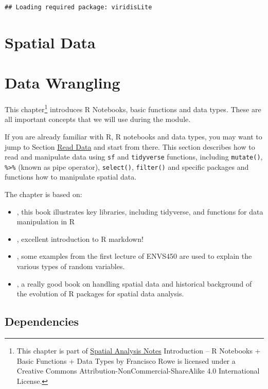 \documentclass[
]{book}
\begin{document}
\begin{verbatim}
## Loading required package: viridisLite
\end{verbatim}

\hypertarget{spatial_data}{%
\chapter{Spatial Data}\label{spatial_data}}

\hypertarget{data_wrangling}{%
\chapter{Data Wrangling}\label{data_wrangling}}

This chapter\footnote{This chapter is part of \href{index.html}{Spatial Analysis Notes} {Introduction -- R Notebooks + Basic Functions + Data Types} by Francisco Rowe is licensed under a Creative Commons Attribution-NonCommercial-ShareAlike 4.0 International License.} introduces R Notebooks, basic functions and data types. These are all important concepts that we will use during the module.

If you are already familiar with R, R notebooks and data types, you may want to jump to Section \protect\hyperlink{sec_readdata}{Read Data} and start from there. This section describes how to read and manipulate data using \texttt{sf} and \texttt{tidyverse} functions, including \texttt{mutate()}, \texttt{\%\textgreater{}\%} (known as pipe operator), \texttt{select()}, \texttt{filter()} and specific packages and functions how to manipulate spatial data.

The chapter is based on:

\begin{itemize}
\item
  \citet{grolemund_wickham_2019_book}, this book illustrates key libraries, including tidyverse, and functions for data manipulation in R
\item
  \citet{Xie_et_al_2019_book}, excellent introduction to R markdown!
\item
  \citet{envs450_2018}, some examples from the first lecture of ENVS450 are used to explain the various types of random variables.
\item
  \citet{Lovelace_et_al_2020_book}, a really good book on handling spatial data and historical background of the evolution of R packages for spatial data analysis.
\end{itemize}

\hypertarget{dependencies}{%
\section{Dependencies}\label{dependencies}}
\end{document}
